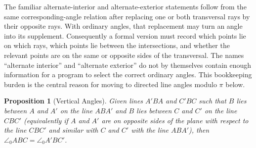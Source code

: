 \documentclass[reqno]{amsart}
\DeclareMathOperator{\1}{\textbf{1}}
\newtheorem{prop}[thm]{Proposition}
\begin{document}
\begin{center}
\end{center}

The familiar alternate-interior and alternate-exterior statements follow from
the same corresponding-angle relation after replacing one or both transversal
rays by their opposite rays.  With ordinary angles, that replacement may turn
an angle into its supplement.  Consequently a formal version must record which
points lie on which rays, which points lie between the intersections, and
whether the relevant points are on the same or opposite sides of the
transversal.  The names ``alternate interior'' and ``alternate exterior'' do
not by themselves contain enough information for a program to select the
correct ordinary angles.  This bookkeeping burden is the central reason for
moving to directed line angles modulo $\pi$ below.


\begin{prop}[Vertical Angles]
    Given lines $A'BA$ and $C'BC$ such that $B$ lies between $A$ and $A'$ on the
    line $ABA'$ and $B$ lies between $C$ and $C'$ on the line $CBC'$
    (equivalently if $A$ and $A'$ are on opposite sides of the plane with
    respect to the line $CBC'$ and similar with $C$ and $C'$ with the line
    $ABA'$), then $\angle_0ABC=\angle_0A'BC'$.
\end{prop}
\end{document}
